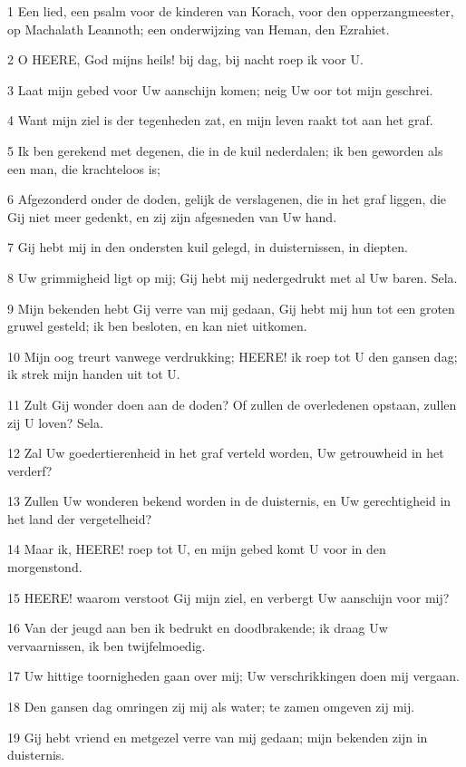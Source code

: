 \par 1 Een lied, een psalm voor de kinderen van Korach, voor den opperzangmeester, op Machalath Leannoth; een onderwijzing van Heman, den Ezrahiet.
\par 2 O HEERE, God mijns heils! bij dag, bij nacht roep ik voor U.
\par 3 Laat mijn gebed voor Uw aanschijn komen; neig Uw oor tot mijn geschrei.
\par 4 Want mijn ziel is der tegenheden zat, en mijn leven raakt tot aan het graf.
\par 5 Ik ben gerekend met degenen, die in de kuil nederdalen; ik ben geworden als een man, die krachteloos is;
\par 6 Afgezonderd onder de doden, gelijk de verslagenen, die in het graf liggen, die Gij niet meer gedenkt, en zij zijn afgesneden van Uw hand.
\par 7 Gij hebt mij in den ondersten kuil gelegd, in duisternissen, in diepten.
\par 8 Uw grimmigheid ligt op mij; Gij hebt mij nedergedrukt met al Uw baren. Sela.
\par 9 Mijn bekenden hebt Gij verre van mij gedaan, Gij hebt mij hun tot een groten gruwel gesteld; ik ben besloten, en kan niet uitkomen.
\par 10 Mijn oog treurt vanwege verdrukking; HEERE! ik roep tot U den gansen dag; ik strek mijn handen uit tot U.
\par 11 Zult Gij wonder doen aan de doden? Of zullen de overledenen opstaan, zullen zij U loven? Sela.
\par 12 Zal Uw goedertierenheid in het graf verteld worden, Uw getrouwheid in het verderf?
\par 13 Zullen Uw wonderen bekend worden in de duisternis, en Uw gerechtigheid in het land der vergetelheid?
\par 14 Maar ik, HEERE! roep tot U, en mijn gebed komt U voor in den morgenstond.
\par 15 HEERE! waarom verstoot Gij mijn ziel, en verbergt Uw aanschijn voor mij?
\par 16 Van der jeugd aan ben ik bedrukt en doodbrakende; ik draag Uw vervaarnissen, ik ben twijfelmoedig.
\par 17 Uw hittige toornigheden gaan over mij; Uw verschrikkingen doen mij vergaan.
\par 18 Den gansen dag omringen zij mij als water; te zamen omgeven zij mij.
\par 19 Gij hebt vriend en metgezel verre van mij gedaan; mijn bekenden zijn in duisternis.

